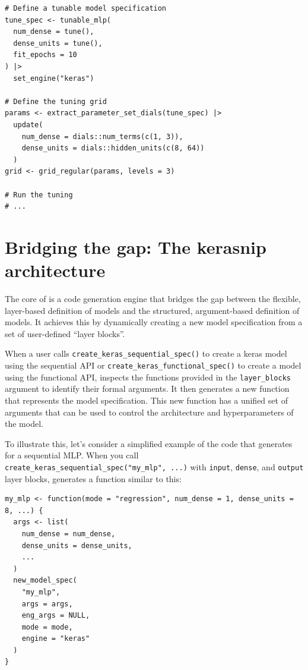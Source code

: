 \begin{verbatim}
# Define a tunable model specification
tune_spec <- tunable_mlp(
  num_dense = tune(),
  dense_units = tune(),
  fit_epochs = 10
) |>
  set_engine("keras")

# Define the tuning grid
params <- extract_parameter_set_dials(tune_spec) |>
  update(
    num_dense = dials::num_terms(c(1, 3)),
    dense_units = dials::hidden_units(c(8, 64))
  )
grid <- grid_regular(params, levels = 3)

# Run the tuning
# ...
\end{verbatim}

\section{Bridging the gap: The kerasnip architecture}\label{bridging-the-gap-the-kerasnip-architecture}

The core of  is a code generation engine that bridges the gap between the flexible, layer-based definition of  models and the structured, argument-based definition of  models. It achieves this by dynamically creating a new  model specification from a set of user-defined ``layer blocks''.

When a user calls \texttt{create\_keras\_sequential\_spec()} to create a keras model using the sequential API or \texttt{create\_keras\_functional\_spec()} to create a model using the functional API,  inspects the functions provided in the \texttt{layer\_blocks} argument to identify their formal arguments. It then generates a new function that represents the  model specification. This new function has a unified set of arguments that can be used to control the architecture and hyperparameters of the  model.

To illustrate this, let's consider a simplified example of the code that  generates for a sequential MLP. When you call \texttt{create\_keras\_sequential\_spec("my\_mlp",\ ...)} with \texttt{input}, \texttt{dense}, and \texttt{output} layer blocks,  generates a function similar to this:

\begin{verbatim}
my_mlp <- function(mode = "regression", num_dense = 1, dense_units = 8, ...) {
  args <- list(
    num_dense = num_dense,
    dense_units = dense_units,
    ...
  )
  new_model_spec(
    "my_mlp",
    args = args,
    eng_args = NULL,
    mode = mode,
    engine = "keras"
  )
}
\end{verbatim}


